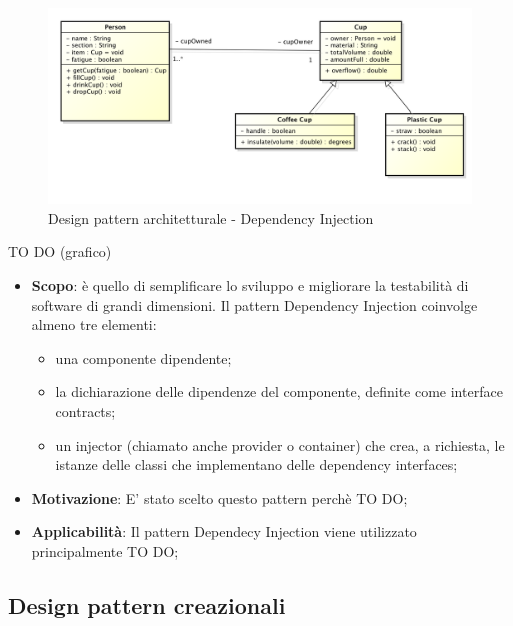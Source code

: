 		\begin{figure}[htbp]
			\centering
			\centerline{\includegraphics[scale=0.3]{./images/example_graph.png}}
			\caption{Design pattern architetturale - Dependency Injection}
		\end{figure}
		TO DO (grafico)
		
		
		\begin{itemize}
			\item \textbf{Scopo}: è quello di semplificare lo sviluppo e migliorare la testabilità di software di grandi dimensioni.
Il pattern Dependency Injection coinvolge almeno tre elementi:

				\begin{itemize}
					\item una componente dipendente;
					\item la dichiarazione delle dipendenze del componente, definite come interface contracts;
					\item un injector (chiamato anche provider o container) che crea, a richiesta, le istanze delle classi che implementano delle dependency interfaces;
				\end{itemize}
			
			\item \textbf{Motivazione}: E' stato scelto questo pattern perchè TO DO;
			
			\item \textbf{Applicabilità}: Il pattern Dependecy Injection viene utilizzato principalmente TO DO;
			
		\end{itemize}
		


	\clearpage 
	\newpage
	\subsection{Design pattern creazionali} %
	
